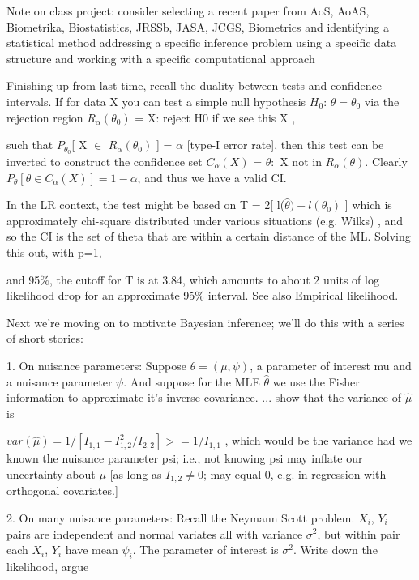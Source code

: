 \documentclass[11pt,a4paper]{article}
\begin{document}
	Note on class project:  consider selecting a recent paper from AoS, AoAS, Biometrika, Biostatistics, JRSSb, JASA, JCGS, Biometrics and identifying a statistical method addressing a specific inference problem using a specific data structure and working with a specific computational approach
	
	Finishing up from last time, recall the duality between tests and confidence intervals.  If for data X you can test a simple null hypothesis $H_0$: $\theta=\theta_0$ via the rejection region $R_\alpha(\theta_0)$ = { X: reject H0 if we see this X }, 
	
	such that $P_{\theta_0}$[ X $\in$ $R_\alpha(\theta_0)$ ] = $\alpha$ [type-I error rate], then this test can be inverted to construct the confidence set $C_\alpha(X)$ = {$ \theta:$  X not in $R_\alpha(\theta) $}.  Clearly $P_\theta[ \theta \in C_\alpha(X) ] = 1 - \alpha$, and thus we have a valid CI.
	
	In the LR context,  the test might be based on T = 2[ l($\hat{\theta}) - l(\theta_0)$ ]  which is approximately chi-square distributed under various situations (e.g. Wilks) , and so the CI is the set of theta that are within a certain distance of the ML.  Solving this out, with p=1, 
	
	and 95$\%$, the cutoff for T is at 3.84, which amounts to about 2 units of log likelihood drop for an approximate 95$\%$ interval.   See also Empirical likelihood.
	
	Next we're moving on to motivate Bayesian inference; we'll do this with a series of short stories:
	
	1. On nuisance parameters: Suppose $\theta = (\mu, \psi)$, a parameter of interest mu and a nuisance parameter $\psi$. And suppose for the MLE $\hat{\theta}$ we use the Fisher information to approximate it's inverse covariance. $ ...$ show that the variance of $\hat{\mu}$ is
	
	$var( \hat{\mu} ) = 1/[ I_{1,1} - I_{1,2}^2/I_{2,2} ]    > = 1/I_{1,1}$  , which would be the variance had we known the nuisance parameter psi; i.e., not knowing psi may inflate our uncertainty about $\mu$ [as long as $I_{1,2} \neq 0$; may equal 0, e.g. in regression with orthogonal covariates.]
	
	2. On many nuisance parameters:  Recall the Neymann Scott problem.  $X_i$, $Y_i$ pairs are independent and normal variates all with variance $\sigma^2$, but within pair each $X_i$, $Y_i$ have mean $\psi_i$.  The parameter of interest is $\sigma^2$.  Write down the likelihood, argue
	
\end{document}
